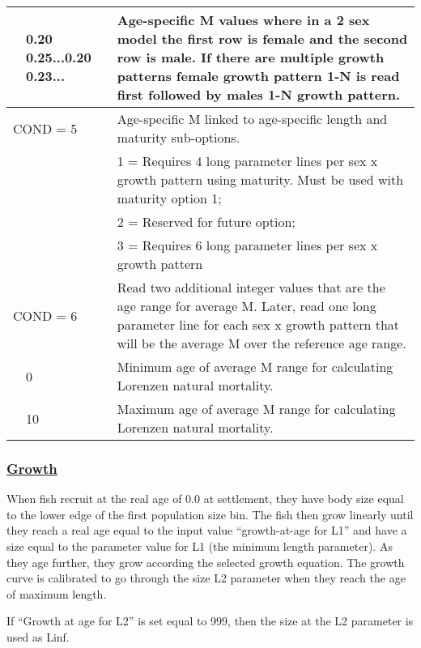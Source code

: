 \begin{longtable}{p{0.5cm} p{2cm} p{12.75cm}}
	& 0.20 0.25...0.20 0.23... & Age-specific M values where in a 2 sex model the first row is female and the second row is male. If there are multiple growth patterns female growth pattern 1-N is read first followed by males 1-N growth pattern. \Bstrut\\
	\hline
	
	\multicolumn{2}{l}{COND = 5} \Tstrut & Age-specific M linked to age-specific length and maturity sub-options. \\

	&  & 1 = Requires 4 long parameter lines per sex x growth pattern using maturity. Must be used with maturity option 1; \\
	&  & 2 = Reserved for future option; \\
	&  & 3 = Requires 6 long parameter lines per sex x growth pattern \Bstrut\\
	\hline

	\multicolumn{2}{l}{COND = 6} \Tstrut & Read two additional integer values that are the age range for average M. Later, read one long parameter line for each sex x growth pattern that will be the average M over the reference age range. \\
	& 0 \Tstrut & Minimum age of average M range for calculating Lorenzen natural mortality. \\
	& 10 \Tstrut & Maximum age of average M range for calculating Lorenzen natural mortality. \\ 
	\hline
\end{longtable}

\hypertarget{Growth}{}
\subsubsection[Growth]{\protect\hyperlink{Growth}{Growth}}

When fish recruit at the real age of 0.0 at settlement, they have body size equal to the lower edge of the first population size bin. The fish then grow linearly until they reach a real age equal to the input value ``growth-at-age for L1'' and have a size equal to the parameter value for L1 (the minimum length parameter). As they age further, they grow according the selected growth equation. The growth curve is calibrated to go through the size L2 parameter when they reach the age of maximum length.
	
If ``Growth at age for L2'' is set equal to 999, then the size at the L2 parameter is used as Linf. 
	
